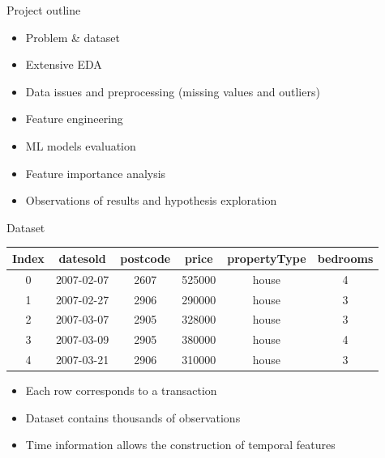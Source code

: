 \documentclass[slidescentered]{beamer}
\begin{document}

\begin{frame}{Project outline}

    \begin{itemize}
        \item Problem \& dataset
        \item Extensive EDA
        \item Data issues and preprocessing (missing values and outliers)
        \item Feature engineering
        \item ML models evaluation
        \item Feature importance analysis
        \item Observations of results and hypothesis exploration
    \end{itemize}

\end{frame}


\begin{frame}{Dataset}
    \addtolength{\tabcolsep}{-4.5pt}
    \begin{tabular}{|c|c|c|c|c|c|}
        \hline
        \textbf{Index} & \textbf{datesold} & \textbf{postcode} & \textbf{price} & \textbf{propertyType} & \textbf{bedrooms} \\ \hline
        0              & 2007-02-07        & 2607              & 525000         & house                 & 4                 \\ \hline
        1              & 2007-02-27        & 2906              & 290000         & house                 & 3                 \\ \hline
        2              & 2007-03-07        & 2905              & 328000         & house                 & 3                 \\ \hline
        3              & 2007-03-09        & 2905              & 380000         & house                 & 4                 \\ \hline
        4              & 2007-03-21        & 2906              & 310000         & house                 & 3                 \\ \hline
    \end{tabular}
    \vspace{1.5em}
    \begin{itemize}

        \item Each row corresponds to a transaction

        \item Dataset contains thousands of observations

        \item Time information allows the construction of temporal features

    \end{itemize}

\end{frame}
\end{document}
